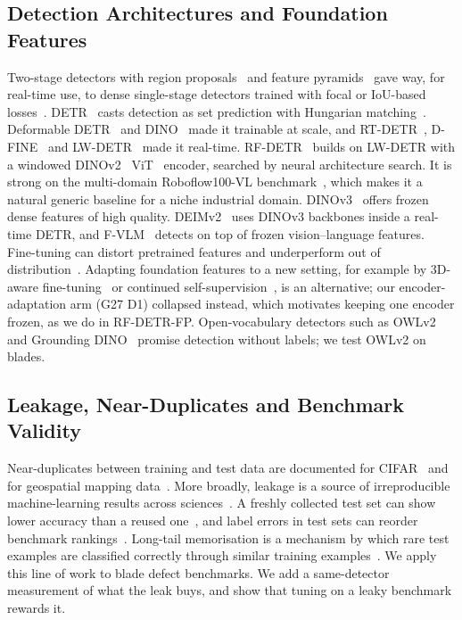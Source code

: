 \subsection{Detection Architectures and Foundation Features}
Two-stage detectors with region proposals~\cite{fasterrcnn} and feature pyramids~\cite{fpn} gave way, for real-time use, to dense single-stage detectors trained with focal or IoU-based losses~\cite{focal,giou,diou,wiou}. DETR~\cite{detr} casts detection as set prediction with Hungarian matching~\cite{hungarian}. Deformable DETR~\cite{deformabledetr} and DINO~\cite{dinodetr} made it trainable at scale, and RT-DETR~\cite{rtdetr}, D-FINE~\cite{dfine} and LW-DETR~\cite{lwdetr} made it real-time. RF-DETR~\cite{rfdetr} builds on LW-DETR with a windowed DINOv2~\cite{dinov2} ViT~\cite{vit} encoder, searched by neural architecture search. It is strong on the multi-domain Roboflow100-VL benchmark~\cite{rf100vl}, which makes it a natural generic baseline for a niche industrial domain. DINOv3~\cite{dinov3} offers frozen dense features of high quality. DEIMv2~\cite{deimv2} uses DINOv3 backbones inside a real-time DETR, and F-VLM~\cite{fvlm} detects on top of frozen vision--language features. Fine-tuning can distort pretrained features and underperform out of distribution~\cite{lpft}. Adapting foundation features to a new setting, for example by 3D-aware fine-tuning~\cite{fit3d} or continued self-supervision~\cite{data2vec}, is an alternative; our encoder-adaptation arm (G27 D1) collapsed instead, which motivates keeping one encoder frozen, as we do in RF-DETR-FP. Open-vocabulary detectors such as OWLv2~\cite{owlv2} and Grounding DINO~\cite{groundingdino} promise detection without labels; we test OWLv2 on blades.

\subsection{Leakage, Near-Duplicates and Benchmark Validity}
Near-duplicates between training and test data are documented for CIFAR~\cite{barz} and for geospatial mapping data~\cite{adimoolam}. More broadly, leakage is a source of irreproducible machine-learning results across sciences~\cite{kapoor}. A freshly collected test set can show lower accuracy than a reused one~\cite{recht}, and label errors in test sets can reorder benchmark rankings~\cite{northcutt}. Long-tail memorisation is a mechanism by which rare test examples are classified correctly through similar training examples~\cite{feldman}. We apply this line of work to blade defect benchmarks. We add a same-detector measurement of what the leak buys, and show that tuning on a leaky benchmark rewards it.

